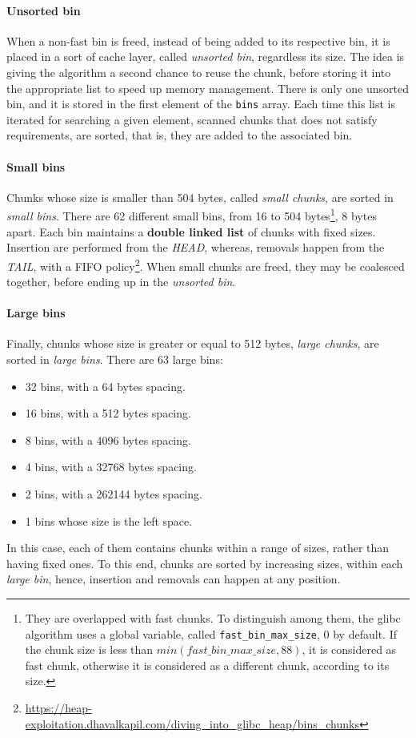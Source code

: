 \documentclass{article}
\numberwithin{equation}{subsection}
\begin{document}
\paragraph{Unsorted bin}
When a non-fast bin is freed, instead of being added to its respective bin, it is placed in a sort of cache layer, called \emph{unsorted bin}, regardless its size. The idea is giving the algorithm a second chance to reuse the chunk, before storing it into the appropriate list to speed up memory management. There is only one unsorted bin, and it is stored in the first element of the \texttt{bins} array. Each time this list is iterated for searching a given element, scanned chunks that does not satisfy requirements, are sorted, that is, they are added to the associated bin.

\paragraph{Small bins}
Chunks whose size is smaller than 504 bytes, called \emph{small chunks}, are sorted in \emph{small bins}. There are 62 different small bins, from 16 to 504 bytes\footnote{They are overlapped with fast chunks. To distinguish among them, the glibc algorithm uses a global variable, called \texttt{fast\_bin\_max\_size}, 0 by default. If the chunk size is less than ${min(fast\_bin\_max\_size, 88)}$, it is considered as fast chunk, otherwise it is considered as a different chunk, according to its size.}, 8 bytes apart. Each bin maintains a \textbf{double linked list} of chunks with fixed sizes. Insertion are performed from the \emph{HEAD}, whereas, removals happen from the \emph{TAIL}, with a FIFO policy\footnote{\href{https://heap-exploitation.dhavalkapil.com/diving_into_glibc_heap/bins_chunks}{https://heap-exploitation.dhavalkapil.com/diving\_into\_glibc\_heap/bins\_chunks}}. When small chunks are freed, they may be coalesced together, before ending up in the \emph{unsorted bin}.
\paragraph{Large bins}
Finally, chunks whose size is greater or equal to 512 bytes, \emph{large chunks}, are sorted in \emph{large bins}. There are 63 large bins: 
\begin{itemize}
    \item 32 bins, with a 64 bytes spacing.
    \item 16 bins, with a 512 bytes spacing.
    \item 8 bins, with a 4096 bytes spacing.
    \item 4 bins, with a 32768 bytes spacing.
    \item 2 bins, with a 262144 bytes spacing.
    \item 1 bins whose size is the left space.
\end{itemize}
In this case, each of them contains chunks within a range of sizes, rather than having fixed ones. To this end, chunks are sorted by increasing sizes, within each \emph{large bin}, hence, insertion and removals can happen at any position. 
\end{document}
